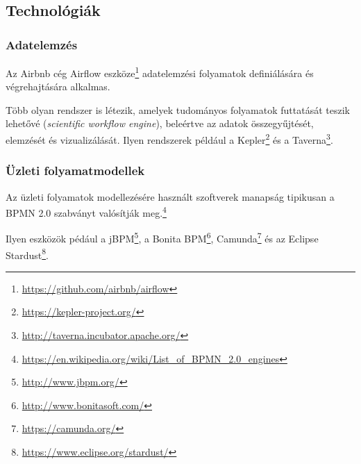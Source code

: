 
\subsection{Technológiák}

\subsubsection{Adatelemzés}

Az Airbnb cég Airflow eszköze\footnote{\url{https://github.com/airbnb/airflow}} adatelemzési folyamatok definiálására és végrehajtására alkalmas.

Több olyan rendszer is létezik, amelyek tudományos folyamatok futtatását teszik lehetővé (\emph{scientific workflow engine}), beleértve az adatok összegyűjtését, elemzését és vizualizálását. Ilyen rendszerek például a 
Kepler\footnote{\url{https://kepler-project.org/}} és a Taverna\footnote{\url{http://taverna.incubator.apache.org/}}.

\subsubsection{Üzleti folyamatmodellek}

Az üzleti folyamatok modellezésére használt szoftverek manapság tipikusan a BPMN 2.0 szabványt valósítják meg.\footnote{\url{https://en.wikipedia.org/wiki/List_of_BPMN_2.0_engines}}

Ilyen eszközök pédául a jBPM\footnote{\url{http://www.jbpm.org/}}, a Bonita BPM\footnote{\url{http://www.bonitasoft.com/}}, Camunda\footnote{\url{https://camunda.org/}} és az Eclipse Stardust\footnote{\url{https://www.eclipse.org/stardust/}}.

